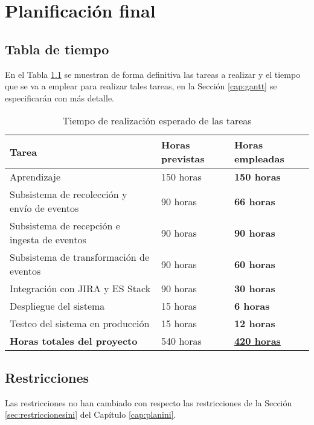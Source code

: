 \chapter{Planificación final}\label{cap:planificacion}


\section{Tabla de tiempo}
En el Tabla \ref{tabla:tiempotareas} se muestran de forma definitiva las tareas a realizar y el tiempo que se va a emplear para realizar tales tareas, en la Sección \ref{cap:gantt} se especificarán con más detalle.

\begin{table}[H]\label{tabla:tiempotareas}
	\centering
	\begin{tabular}{|l|l|l|}
		\hline
		\textbf{Tarea}                               & \textbf{Horas previstas} & \textbf{Horas empleadas}       \\ \hline
		Aprendizaje                                  & 150 horas                & \textbf{150 horas}             \\ \hline
		Subsistema de recolección y envío de eventos & 90 horas                 & \textbf{66 horas}              \\ \hline
		Subsistema de recepción e ingesta de eventos & 90 horas                 & \textbf{90 horas}              \\ \hline
		Subsistema de transformación de eventos      & 90 horas                 & \textbf{60 horas}              \\ \hline
		Integración con JIRA y ES Stack              & 90 horas                 & \textbf{30 horas}              \\ \hline
		Despliegue del sistema                       & 15 horas                 & \textbf{6 horas}               \\ \hline
		Testeo del sistema en producción             & 15 horas                 & \textbf{12 horas}              \\ \hline
		\textbf{Horas totales del proyecto}          & 540 horas                & \underline{\textbf{420 horas}} \\ \hline
	\end{tabular}
	\caption{Tiempo de realización esperado de las tareas}
\end{table}

\section{Restricciones}
Las restricciones no han cambiado con respecto las restricciones de la Sección \ref{sec:restriccionesini} del Capítulo \ref{cap:planini}.

